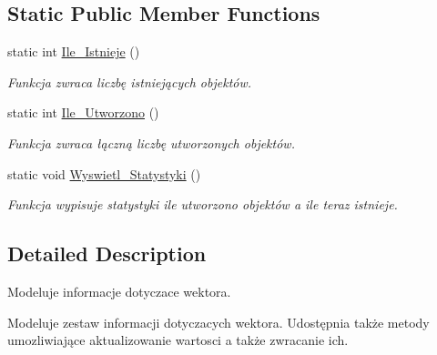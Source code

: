 \subsection*{Static Public Member Functions}
\begin{DoxyCompactItemize}
\item 
\hypertarget{class_wektor2_d_ab1a5415d3116508e9bfc04d0fc151518}{static int \hyperlink{class_wektor2_d_ab1a5415d3116508e9bfc04d0fc151518}{Ile\+\_\+\+Istnieje} ()}\label{class_wektor2_d_ab1a5415d3116508e9bfc04d0fc151518}

\begin{DoxyCompactList}\small\item\em Funkcja zwraca liczbę istniejących objektów. \end{DoxyCompactList}\item 
\hypertarget{class_wektor2_d_a1921cd3978ac7c2d470e56f9e8884384}{static int \hyperlink{class_wektor2_d_a1921cd3978ac7c2d470e56f9e8884384}{Ile\+\_\+\+Utworzono} ()}\label{class_wektor2_d_a1921cd3978ac7c2d470e56f9e8884384}

\begin{DoxyCompactList}\small\item\em Funkcja zwraca łączną liczbę utworzonych objektów. \end{DoxyCompactList}\item 
\hypertarget{class_wektor2_d_ac579fec5434298d8286296879c311220}{static void \hyperlink{class_wektor2_d_ac579fec5434298d8286296879c311220}{Wyswietl\+\_\+\+Statystyki} ()}\label{class_wektor2_d_ac579fec5434298d8286296879c311220}

\begin{DoxyCompactList}\small\item\em Funkcja wypisuje statystyki ile utworzono objektów a ile teraz istnieje. \end{DoxyCompactList}\end{DoxyCompactItemize}


\subsection{Detailed Description}
Modeluje informacje dotyczace wektora. 

Modeluje zestaw informacji dotyczacych wektora. Udostępnia także metody umozliwiające aktualizowanie wartosci a także zwracanie ich. 

